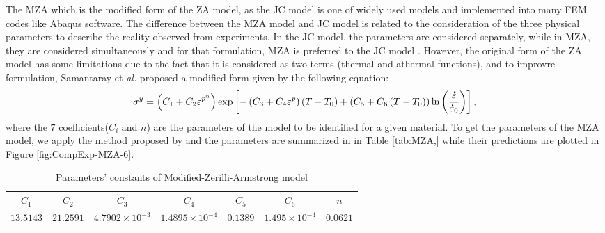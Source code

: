 \documentclass[twoside,english,1p,final,sort&compress]{elsarticle}
\makeatletter
\theoremstyle{plain}
\DeclareRobustCommand{\mdot}[1]{\accentset{\mbox{\bfseries .}}{#1}}
\DeclareRobustCommand{\eal}{et \emph{al.}\@\xspace}
\makeatother
\begin{document}
The MZA which is the modified form of the ZA model, as the JC model is one of widely used models and implemented into many FEM codes like Abaqus software. The difference between the MZA model and JC model is related to the consideration of the three physical parameters to describe the reality observed from experiments. In the JC model, the parameters are considered separately, while in MZA, they are  considered simultaneously and for that formulation, MZA is preferred to the JC model \cite{Hull-2011}.
However, the original form of the ZA model has some limitations due to the fact that it is considered as two terms (thermal and athermal functions), and to improvre formulation, Samantaray \eal \cite{Samantaray-2009} proposed a modified form given by the following equation:
\begin{equation}
\label{eq:MZA-model}
\sigma^y = \left(C_{1}+C_{2}\varepsilon^{p^n}\right) \exp\left[-\left(C_{3}+C_{4}\varepsilon^p\right)\left(T-T_0\right) + \left(C_{5}+C_{6}\left(T-T_0\right)\right)\ln\left( \frac{\mdot\varepsilon}{\mdot{\varepsilon}_0}\right)\right],
\end{equation}
where the $7$ coefficients($C_i$ and $n$) are the parameters of the model to be identified for a given material.
To get the parameters of the MZA model, we apply the method proposed by \cite{Samantaray-2009} and the parameters are summarized in in Table \ref{tab:MZA,} while their predictions are plotted in Figure \ref{fig:CompExp-MZA-6}.
\begin{table}[h!]
\centering{}
\caption{Parameters' constants of Modified-Zerilli-Armstrong model}
\begin{tabular}{ccccccc}
	\hline
	  $C_1$   &   $C_2$   &         $C_3$          &         $C_4$          &  $C_5$   &         $C_6$         &   $n$    \\
	$13.5143$ & $21.2591$ & $4.7902\times 10^{-3}$ & $1.4895\times 10^{-4}$ & $0.1389$ & $1.495\times 10^{-4}$ & $0.0621$ \\ \hline
\end{tabular}
\label{tab:MZA}
\end{table}
\end{document}
